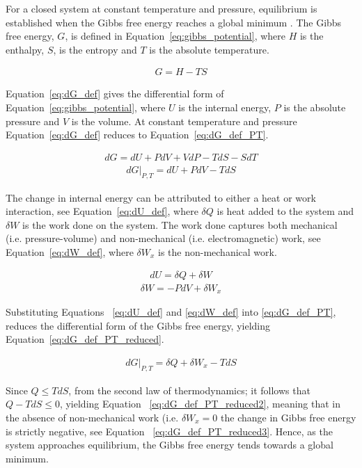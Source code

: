 For a closed system at constant temperature and pressure, equilibrium is established when the Gibbs free energy reaches a global minimum \cite{Gyftopoulos2005}. The Gibbs free energy, \(G\), is defined in Equation~\eqref{eq:gibbs_potential}, where  \(H\) is the enthalpy,  \(S\), is the entropy and  \(T\) is the absolute temperature.

\begin{align} 
    G = H - TS \label{eq:gibbs_potential}
\end{align}

Equation~\eqref{eq:dG_def} gives the differential form of Equation~\eqref{eq:gibbs_potential}, where \(U\) is the internal energy, \(P\) is the absolute pressure and \(V\) is the volume. At constant temperature and pressure Equation~\eqref{eq:dG_def} reduces to Equation~\eqref{eq:dG_def_PT}.

\begin{align} 
    dG = dU + PdV + VdP - TdS - SdT \label{eq:dG_def}
\end{align}
\begin{align} 
    dG|_{P,T} = dU + PdV - TdS \label{eq:dG_def_PT}
\end{align}

The change in internal energy can be attributed to either a heat or work interaction, see Equation~\eqref{eq:dU_def}, where \(\delta Q\) is heat added to the system and \(\delta W\) is the work done on the system. The work done captures both mechanical (i.e. pressure-volume) and non-mechanical (i.e. electromagnetic) work, see Equation~\eqref{eq:dW_def}, where  \(\delta W_x\) is the non-mechanical work.

\begin{align} 
    dU = \delta Q + \delta W \label{eq:dU_def}
\end{align}
\begin{align} 
    \delta W = - PdV + \delta W_x \label{eq:dW_def}
\end{align}

Substituting Equations ~\eqref{eq:dU_def} and \eqref{eq:dW_def} into \eqref{eq:dG_def_PT}, reduces the differential form of the Gibbs free energy, yielding Equation~\eqref{eq:dG_def_PT_reduced}.

\begin{align} 
    dG|_{P,T} = \delta Q + \delta W_x - TdS \label{eq:dG_def_PT_reduced}
\end{align}

Since \(Q \leq TdS\), from the second law of thermodynamics; it follows that \(Q - TdS \leq 0\), yielding Equation ~\eqref{eq:dG_def_PT_reduced2}, meaning that in the absence of non-mechanical work (i.e. \(\delta W_x = 0\) the change in Gibbs free energy is strictly negative, see Equation ~\eqref{eq:dG_def_PT_reduced3}. Hence, as the system approaches equilibrium, the Gibbs free energy tends towards a global minimum.

